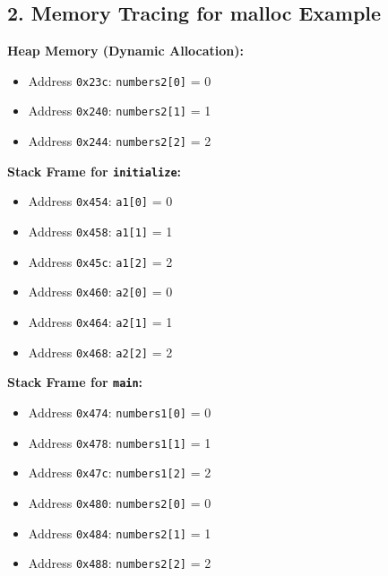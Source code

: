 \documentclass[12pt]{article}
\begin{document}
\subsection*{2. Memory Tracing for malloc Example}

\textbf{Heap Memory (Dynamic Allocation):}
\begin{itemize}
    \item Address \texttt{0x23c}: \texttt{numbers2[0]} = 0
    \item Address \texttt{0x240}: \texttt{numbers2[1]} = 1
    \item Address \texttt{0x244}: \texttt{numbers2[2]} = 2
\end{itemize}

\textbf{Stack Frame for \texttt{initialize}:}
\begin{itemize}
    \item Address \texttt{0x454}: \texttt{a1[0]} = 0
    \item Address \texttt{0x458}: \texttt{a1[1]} = 1
    \item Address \texttt{0x45c}: \texttt{a1[2]} = 2
    \item Address \texttt{0x460}: \texttt{a2[0]} = 0
    \item Address \texttt{0x464}: \texttt{a2[1]} = 1
    \item Address \texttt{0x468}: \texttt{a2[2]} = 2
\end{itemize}

\textbf{Stack Frame for \texttt{main}:}
\begin{itemize}
    \item Address \texttt{0x474}: \texttt{numbers1[0]} = 0
    \item Address \texttt{0x478}: \texttt{numbers1[1]} = 1
    \item Address \texttt{0x47c}: \texttt{numbers1[2]} = 2
    \item Address \texttt{0x480}: \texttt{numbers2[0]} = 0
    \item Address \texttt{0x484}: \texttt{numbers2[1]} = 1
    \item Address \texttt{0x488}: \texttt{numbers2[2]} = 2
\end{itemize}
\end{document}
